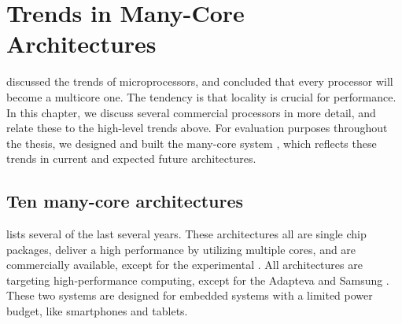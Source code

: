 

\chapter{Trends in Many-Core Architectures}
\label{c:trends}
\label{c:starburst}

\begin{abstract}%
Based on a comparison of ten contemporary commercial many-core architectures, several trends can be observed.
The cores are relatively simple, and memory bandwidth per core is limited.
Most architectures have \aclp{MLC}, which are hardware cache coherent.
However, weak memory models are used.
In contrast to the attention in research, only a few architectures have \aclp{SPM}.
Our many-core architecture, \Starburst, captures both commercial and research trends.
\end{abstract}

 discussed the trends of microprocessors, and concluded that every processor will become a multicore one.
The tendency is that locality is crucial for performance.
In this chapter, we discuss several commercial processors in more detail, and relate these to the high-level trends above.
For evaluation purposes throughout the thesis, we designed and built the many-core system \Starburst*, which reflects these trends in current and expected future architectures.

\section{Ten many-core architectures}
\label{s:trends:architectures}

 lists several  of the last several years.
These architectures all are single chip packages, deliver a high performance by utilizing multiple cores, and are commercially available, except for the experimental \IntelSCC.
All architectures are targeting high-performance computing, except for the Adapteva \Epiphany and Samsung \Exynos.
These two systems are designed for embedded systems with a limited power budget, like smartphones and tablets.

